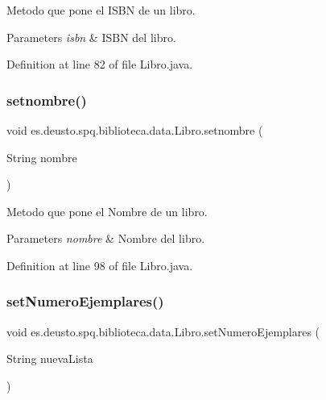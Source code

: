 Metodo que pone el I\+S\+BN de un libro. 
\begin{DoxyParams}{Parameters}
{\em isbn} & I\+S\+BN del libro. \\
\hline
\end{DoxyParams}


Definition at line 82 of file Libro.\+java.

\mbox{\label{classes_1_1deusto_1_1spq_1_1biblioteca_1_1data_1_1_libro_a46e4d899a426e535f86fc40d1995f674}} 
\subsubsection{\texorpdfstring{setnombre()}{setnombre()}}
{\footnotesize\ttfamily void es.\+deusto.\+spq.\+biblioteca.\+data.\+Libro.\+setnombre (\begin{DoxyParamCaption}\item[{String}]{nombre }\end{DoxyParamCaption})}

Metodo que pone el Nombre de un libro. 
\begin{DoxyParams}{Parameters}
{\em nombre} & Nombre del libro. \\
\hline
\end{DoxyParams}


Definition at line 98 of file Libro.\+java.

\mbox{\label{classes_1_1deusto_1_1spq_1_1biblioteca_1_1data_1_1_libro_a3531f95abf324d93f4a871f836c1cc57}} 
\subsubsection{\texorpdfstring{set\+Numero\+Ejemplares()}{setNumeroEjemplares()}}
{\footnotesize\ttfamily void es.\+deusto.\+spq.\+biblioteca.\+data.\+Libro.\+set\+Numero\+Ejemplares (\begin{DoxyParamCaption}\item[{String}]{nueva\+Lista }\end{DoxyParamCaption})}

